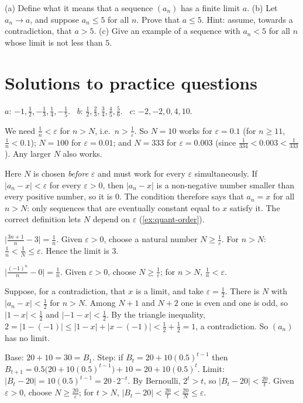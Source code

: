  (a) Define what it means that a sequence $(a_n)$ has a finite limit $a$.
(b) Let $a_n\to a$, and suppose $a_n\le5$ for all $n$. Prove that $a\le5$. Hint: assume, towards a contradiction, that $a>5$.
(c) Give an example of a sequence with $a_n<5$ for all $n$ whose limit is not less than $5$.

\section{Solutions to practice questions}
$a$: $-1,\tfrac12,-\tfrac13,\tfrac14,-\tfrac15$. \ $b$: $\tfrac12,\tfrac23,\tfrac34,\tfrac45,\tfrac56$. \ $c$: $-2,-2,0,4,10$.

We need $\frac1n<\varepsilon$ for $n>N$, i.e.\ $n>\frac1\varepsilon$. So $N=10$ works for $\varepsilon=0.1$ (for $n\ge11$, $\frac1n<0.1$); $N=100$ for
$\varepsilon=0.01$; and $N=333$ for $\varepsilon=0.003$ (since $\frac1{334}<0.003<\frac1{333}$). Any larger $N$ also works.

Here $N$ is chosen \emph{before} $\varepsilon$ and must work for every $\varepsilon$ simultaneously. If $|a_n-x|<\varepsilon$ for every
$\varepsilon>0$, then $|a_n-x|$ is a non-negative number smaller than every positive number, so it is $0$. The condition therefore says
that $a_n=x$ for all $n>N$: only sequences that are eventually constant equal to $x$ satisfy it. The correct definition lets $N$
depend on $\varepsilon$ (\cref{ex:quant-order}).

$\big|\frac{3n+1}n-3\big|=\frac1n$. Given $\varepsilon>0$, choose a natural number $N\ge\frac1\varepsilon$. For $n>N$:
$\frac1n<\frac1N\le\varepsilon$. Hence the limit is $3$.

$\big|\frac{(-1)^n}{n}-0\big|=\frac1n$. Given $\varepsilon>0$, choose $N\ge\frac1\varepsilon$; for $n>N$, $\frac1n<\varepsilon$.

Suppose, for a contradiction, that $x$ is a limit, and take $\varepsilon=\tfrac12$. There is $N$ with $|a_n-x|<\tfrac12$ for $n>N$. Among
$N+1$ and $N+2$ one is even and one is odd, so $|1-x|<\tfrac12$ and $|-1-x|<\tfrac12$. By the triangle inequality,
$2=|1-(-1)|\le|1-x|+|x-(-1)|<\tfrac12+\tfrac12=1$, a contradiction. So $(a_n)$ has no limit.

Base: $20+10=30=B_1$. Step: if $B_t=20+10(0.5)^{t-1}$ then $B_{t+1}=0.5\big(20+10(0.5)^{t-1}\big)+10=20+10(0.5)^t$.
Limit: $|B_t-20|=10(0.5)^{t-1}=20\cdot2^{-t}$. By Bernoulli, $2^t>t$, so $|B_t-20|<\frac{20}{t}$. Given $\varepsilon>0$, choose $N\ge\frac{20}\varepsilon$;
for $t>N$, $|B_t-20|<\frac{20}t<\frac{20}N\le\varepsilon$.


